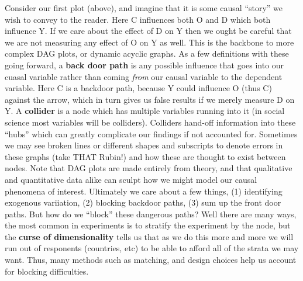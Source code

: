 \documentclass[12pt]{article}\usepackage[]{graphicx}\usepackage[]{color}
\begin{document}
\begin{flushleft}
\begin{center}
\end{center}
\hfill

Consider our first plot (above), and imagine that it is some causal ``story'' we wish to convey to the reader. Here C influences both O and D which both influence Y. If we care about the effect of D on Y then we ought be careful that we are not measuring any effect of O on Y as well. This is the backbone to more complex DAG plots, or dynamic acyclic graphs. As a few definitions with these going forward, a \textbf{back door path} is any possible influence that goes into our cuasal variable rather than coming \textit{from} our causal variable to the dependent variable. Here C is a backdoor path, because Y could influence O (thus C) against the arrow, which in turn gives us false results if we merely measure D on Y. A \textbf{collider} is a node which has multiple variables running into it (in social science most variables will be colliders). Colliders hand-off information into these ``hubs'' which can greatly complicate our findings if not accounted for. Sometimes we may see broken lines or different shapes and subscripts to denote errors in these graphs (take THAT Rubin!) and how these are thought to exist between nodes. Note that DAG plots are made entirely from theory, and that qualitative and quantitative data alike can sculpt how we might model our causal phenomena of interest. Ultimately we care about a few things, (1) identifying exogenous variiation, (2) blocking backdoor paths, (3) sum up the front door paths. But how do we ``block'' these dangerous paths? Well there are many ways, the most common in experiments is to stratify the experiment by the node, but the \textbf{curse of dimensionality} tells us that as we do this more and more we will run out of responents (countries, etc) to be able to afford all of the strata we may want. Thus, many methods such as matching, and design choices help us account for blocking difficulties.    


\end{flushleft}
\end{document}
